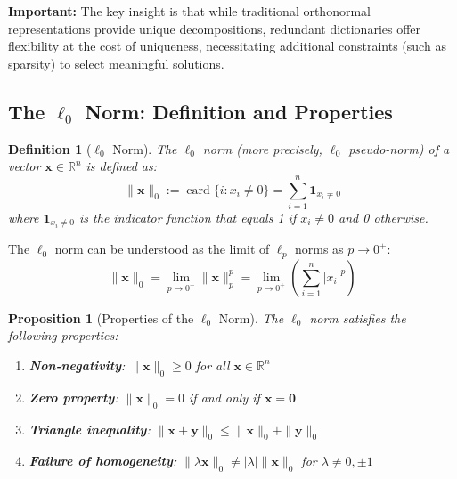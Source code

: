 \documentclass[12pt]{article}
\DeclareMathOperator{\card}{card}
\newtheorem{proposition}[theorem]{Proposition}
\newtheorem{definition}[theorem]{Definition}
\newenvironment{importantbox}
{\begin{framed}\noindent\textbf{Important:}\quad}
{\end{framed}}
\begin{document}
\begin{importantbox}
    The key insight is that while traditional orthonormal representations provide unique decompositions, redundant dictionaries offer flexibility at the cost of uniqueness, necessitating additional constraints (such as sparsity) to select meaningful solutions.
\end{importantbox}

\newpage

\subsection{The $\ell_0$ Norm: Definition and Properties}

\begin{definition}[$\ell_0$ Norm]\label{def:l0_norm}
    The $\ell_0$ norm (more precisely, $\ell_0$ pseudo-norm) of a vector $\mathbf{x} \in \mathbb{R}^n$ is defined as:
    \begin{equation}\label{eq:l0_definition}
        \|\mathbf{x}\|_0 := \card\{i : x_i \neq 0\} = \sum_{i=1}^n \mathbf{1}_{x_i \neq 0}
    \end{equation}
    where $\mathbf{1}_{x_i \neq 0}$ is the indicator function that equals 1 if $x_i \neq 0$ and 0 otherwise.
\end{definition}

The $\ell_0$ norm can be understood as the limit of $\ell_p$ norms as $p \to 0^+$:
\begin{equation}\label{eq:l0_limit}
    \|\mathbf{x}\|_0 = \lim_{p \to 0^+} \|\mathbf{x}\|_p^p = \lim_{p \to 0^+} \left(\sum_{i=1}^n |x_i|^p\right)
\end{equation}

\begin{proposition}[Properties of the $\ell_0$ Norm]\label{prop:l0_properties}
    The $\ell_0$ norm satisfies the following properties:
    \begin{enumerate}
        \item \textbf{Non-negativity}: $\|\mathbf{x}\|_0 \geq 0$ for all $\mathbf{x} \in \mathbb{R}^n$
        \item \textbf{Zero property}: $\|\mathbf{x}\|_0 = 0$ if and only if $\mathbf{x} = \mathbf{0}$
        \item \textbf{Triangle inequality}: $\|\mathbf{x} + \mathbf{y}\|_0 \leq \|\mathbf{x}\|_0 + \|\mathbf{y}\|_0$
        \item \textbf{Failure of homogeneity}: $\|\lambda\mathbf{x}\|_0 \neq |\lambda|\|\mathbf{x}\|_0$ for $\lambda \neq 0, \pm 1$
    \end{enumerate}
\end{proposition}
\end{document}
